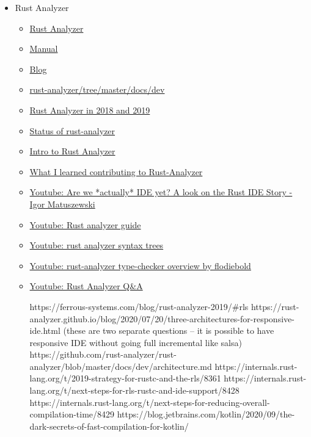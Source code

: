 \documentclass[12pt, a4paper]{report}
\begin{document}
\begin{itemize}[noitemsep]
  \item Rust Analyzer
    \begin{itemize}[noitemsep]
    \item \href{https://rust-analyzer.github.io/}{\Square Rust Analyzer}
    \item \href{https://rust-analyzer.github.io/manual.html}{\Square Manual}
    \item \href{https://rust-analyzer.github.io/blog}{\Square Blog}
    \item \href{https://github.com/rust-analyzer/rust-analyzer/tree/master/docs/dev}{\Square rust-analyzer/tree/master/docs/dev}
    \item \href{https://ferrous-systems.com/blog/rust-analyzer-2019/}{\Square Rust Analyzer in 2018 and 2019}
    \item \href{https://ferrous-systems.com/blog/rust-analyzer-status-opencollective/}{\Square Status of rust-analyzer}
    \item \href{https://blog.logrocket.com/intro-to-rust-analyzer/}{ Intro to Rust Analyzer}
    \item \href{https://dev.to/bnjjj/what-i-learned-contributing-to-rust-analyzer-4c7e}{ What I learned contributing to Rust-Analyzer}
    \item \href{https://www.youtube.com/watch?v=7_7ckOKZCJE}{\Square Youtube: Are we *actually* IDE yet? A look on the Rust IDE Story - Igor Matuszewski}
    \item \href{https://www.youtube.com/watch?v=ANKBNiSWyfc}{\Square Youtube: Rust analyzer guide}
    \item \href{https://www.youtube.com/watch?v=DGAuLWdCCAI}{\Square Youtube: rust analyzer syntax trees}
    \item \href{https://www.youtube.com/watch?v=Lmp3P9WNL8o}{\Square Youtube: rust-analyzer type-checker overview by flodiebold}
    \item \href{https://www.youtube.com/playlist?list=PLXajQV_H-DxLMBt0amcuxgTeOTj6L-YGl}{\Square Youtube: Rust Analyzer Q\&A}

    https://ferrous-systems.com/blog/rust-analyzer-2019/#rls
    https://rust-analyzer.github.io/blog/2020/07/20/three-architectures-for-responsive-ide.html
    (these are two separate questions -- it is possible to have responsive IDE without going full incremental like salsa)
    https://github.com/rust-analyzer/rust-analyzer/blob/master/docs/dev/architecture.md
    https://internals.rust-lang.org/t/2019-strategy-for-rustc-and-the-rls/8361
    https://internals.rust-lang.org/t/next-steps-for-rls-rustc-and-ide-support/8428
    https://internals.rust-lang.org/t/next-steps-for-reducing-overall-compilation-time/8429
    https://blog.jetbrains.com/kotlin/2020/09/the-dark-secrets-of-fast-compilation-for-kotlin/
    \end{itemize}


\end{itemize}
\end{document}
